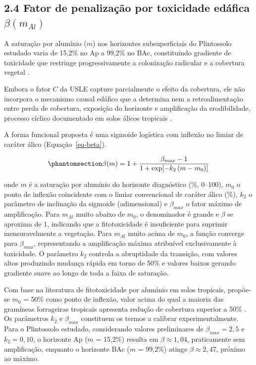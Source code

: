 \documentclass[
  brazilian,
  authoryear,
  preprint]{elsarticle}
\begin{document}
\subsection{\texorpdfstring{2.4 Fator de penalização por toxicidade
edáfica
\(\beta(m_{Al})\)}{2.4 Fator de penalização por toxicidade edáfica \textbackslash beta(m\_\{Al\})}}\label{fator-de-penalizauxe7uxe3o-por-toxicidade-eduxe1fica-betam_al}

A saturação por alumínio (\(m\)) nos horizontes subsuperficiais do
Plintossolo estudado varia de 15,2\% no Ap a 99,2\% no BAc, constituindo
gradiente de toxicidade que restringe progressivamente a colonização
radicular e a cobertura vegetal \citep{de_oliveira_et_al_2024}.

Embora o fator \(C\) da USLE capture parcialmente o efeito da cobertura,
ele não incorpora o mecanismo causal edáfico que a determina nem a
retroalimentação entre perda de cobertura, exposição do horizonte e
amplificação da erodibilidade, processo cíclico documentado em solos
álicos tropicais \citep{cassol_et_al_2023}.

A forma funcional proposta é uma sigmoide logística com inflexão no
limiar de caráter álico (Equação~\ref{eq-beta}).

\begin{equation}\phantomsection\label{eq-beta}{
\beta(m) = 1 + \dfrac{\beta_{max} - 1}{1 + \exp\!\left[-k_2\,(m - m_0)\right]}
}\end{equation}

onde \(m\) é a saturação por alumínio do horizonte diagnóstico (\%,
0--100), \(m_0\) o ponto de inflexão coincidente com o limiar
convencional de caráter álico (\%), \(k_2\) o parâmetro de inclinação da
sigmoide (adimensional) e \(\beta_{max}\) o fator máximo de
amplificação. Para \(m_{Al}\) muito abaixo de \(m_0\), o denominador é
grande e \(\beta\) se aproxima de 1, indicando que a fitotoxicidade é
insuficiente para suprimir mensuravelmente a vegetação. Para \(m_{Al}\)
muito acima de \(m_0\), a função converge para \(\beta_{max}\),
representando a amplificação máxima atribuível exclusivamente à
toxicidade. O parâmetro \(k_2\) controla a abruptidade da transição, com
valores altos produzindo mudança rápida em torno de 50\% e valores
baixos gerando gradiente suave ao longo de toda a faixa de saturação.

Com base na literatura de fitotoxicidade por alumínio em solos
tropicais, propõe-se \(m_0\) = 50\% como ponto de inflexão, valor acima
do qual a maioria das gramíneas forrageiras tropicais apresenta redução
de cobertura superior a 50\% \citep{embrapa_2018}. Os parâmetros \(k_2\)
e \(\beta_{max}\) constituem os termos a calibrar experimentalmente.
Para o Plintossolo estudado, considerando valores preliminares de
\(\beta_{max} = 2{,}5\) e \(k_2 = 0{,}10\), o horizonte Ap (\(m\) =
15,2\%) resulta em \(\beta \approx 1{,}04\), praticamente sem
amplificação, enquanto o horizonte BAc (\(m\) = 99,2\%) atinge
\(\beta \approx 2{,}47\), próximo ao máximo.
\end{document}
